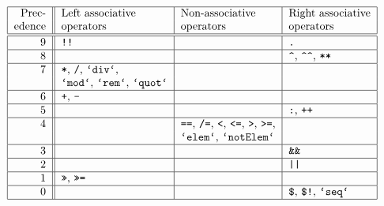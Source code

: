 \begin{table}[htb]
\[
\centerline{
\bto{|r||l|l|l|}
\hline 
Prec-  & Left associative       & Non-associative       & Right associative \\
edence & operators              & operators             & operators \\ \hline\hline
9  & \mbox{\tt !!}               &                               & \mbox{\tt .}             \\ \hline
8  &                    &                               & \mbox{\tt {\char'136}}, \mbox{\tt {\char'136}{\char'136}}, \mbox{\tt **} \\ \hline
7  & \mbox{\tt *}, \mbox{\tt /}, \mbox{\tt `div`},                 &               &  \\
   & \mbox{\tt `mod`}, \mbox{\tt `rem`}, \mbox{\tt `quot`}         &               &  \\ \hline
6  & \mbox{\tt +}, \mbox{\tt -}           &                               &                 \\ \hline
5  &                    &                               & \mbox{\tt :}, \mbox{\tt ++}       \\ \hline
4  &                    & \mbox{\tt ==}, \mbox{\tt /=}, \mbox{\tt <}, \mbox{\tt <=}, \mbox{\tt >}, \mbox{\tt >=}, &             \\
   &                    & \mbox{\tt `elem`}, \mbox{\tt `notElem`}         &                 \\ \hline
3  &                    &                               & \mbox{\tt {\char'46}{\char'46}}            \\ \hline
2  &                    &                               & \mbox{\tt ||}            \\ \hline
1  &    \mbox{\tt >>}, \mbox{\tt >>=}     &                               &               \\ \hline
0  &                    &                               & \mbox{\tt {\char'44}}, \mbox{\tt {\char'44}!}, \mbox{\tt `seq`}    \\ \hline
\eto}
\]
\label{prelude-fixities}
\indextt{**}
\indextt{*}
\indextt{/}
\indextt{+}
\indextt{-}
\indextt{:}
\indextt{++}
\indextt{/=}
\indextt{<}
\indextt{<=}
\indextt{==}
\indextt{>}
\indextt{>=}
\indextt{>>}
\indextt{>>=}
\end{table}

